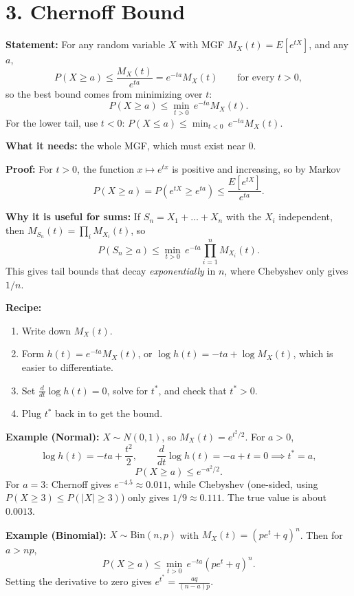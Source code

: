 \documentclass{article}
\begin{document}
\section*{3. Chernoff Bound}

\textbf{Statement:} For any random variable $X$ with MGF
$M_X(t) = E[e^{tX}]$, and any $a$,
$$
P(X \ge a) \le \frac{M_X(t)}{e^{ta}} = e^{-ta} M_X(t)
\qquad \text{for every } t > 0,
$$
so the best bound comes from minimizing over $t$:
$$
P(X \ge a) \le \min_{t > 0} \, e^{-ta} M_X(t).
$$
For the lower tail, use $t < 0$: \quad
$P(X \le a) \le \min_{t < 0} \, e^{-ta} M_X(t)$.

\textbf{What it needs:} the whole MGF, which must exist near $0$.

\textbf{Proof:} For $t > 0$, the function $x \mapsto e^{tx}$ is positive and
increasing, so by Markov
$$
P(X \ge a) = P(e^{tX} \ge e^{ta}) \le \frac{E[e^{tX}]}{e^{ta}}.
$$

\textbf{Why it is useful for sums:} If $S_n = X_1 + \dots + X_n$ with the
$X_i$ independent, then $M_{S_n}(t) = \prod_i M_{X_i}(t)$, so
$$
P(S_n \ge a) \le \min_{t > 0} \, e^{-ta} \prod_{i=1}^n M_{X_i}(t).
$$
This gives tail bounds that decay \emph{exponentially} in $n$, where
Chebyshev only gives $1/n$.

\textbf{Recipe:}
\begin{enumerate}
    \item Write down $M_X(t)$.
    \item Form $h(t) = e^{-ta} M_X(t)$, or $\log h(t) = -ta + \log M_X(t)$,
          which is easier to differentiate.
    \item Set $\frac{d}{dt} \log h(t) = 0$, solve for $t^*$, and check that
          $t^* > 0$.
    \item Plug $t^*$ back in to get the bound.
\end{enumerate}

\textbf{Example (Normal):} $X \sim N(0, 1)$, so $M_X(t) = e^{t^2/2}$. For
$a > 0$,
$$
\log h(t) = -ta + \frac{t^2}{2}, \qquad
\frac{d}{dt}\log h(t) = -a + t = 0 \implies t^* = a,
$$
$$
P(X \ge a) \le e^{-a^2/2}.
$$
For $a = 3$: Chernoff gives $e^{-4.5} \approx 0.011$, while Chebyshev
(one-sided, using $P(X \ge 3) \le P(|X| \ge 3)$) only gives $1/9 \approx 0.111$.
The true value is about $0.0013$.

\textbf{Example (Binomial):} $X \sim \text{Bin}(n, p)$ with
$M_X(t) = (pe^t + q)^n$. Then for $a > np$,
$$
P(X \ge a) \le \min_{t>0} \, e^{-ta}(pe^t + q)^n.
$$
Setting the derivative to zero gives $e^{t^*} = \frac{aq}{(n-a)p}$.
\end{document}
